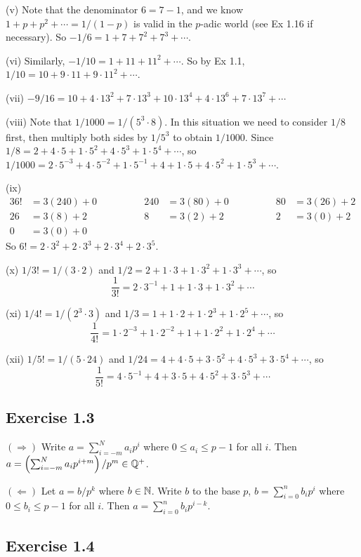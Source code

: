 \documentclass[../Koblitz.tex]{subfiles}
\begin{document}
(v) Note that the denominator $6=7-1$, and we know $1+p+p^2+\cdots=1/(1-p)$ is valid in the $p$-adic world (see Ex 1.16 if necessary). So $-1/6=1+7+7^2+7^3+\cdots$.

(vi) Similarly, $-1/10=1+11+11^2+\cdots$. So by Ex 1.1, $1/10=10+9\cdot11+9\cdot11^2+\cdots$.

(vii) $-9/16=10+4\cdot13^2+7\cdot13^3+10\cdot13^4+4\cdot13^6+7\cdot13^7+\cdots$

(viii) Note that $1/1000=1/(5^3\cdot8)$. In this situation we need to consider $1/8$ first, then multiply both sides by $1/5^3$ to obtain $1/1000$. Since $1/8=2+4\cdot5+1\cdot5^2+4\cdot5^3+1\cdot5^4+\cdots$, so $1/1000=2\cdot5^{-3}+4\cdot5^{-2}+1\cdot5^{-1}+4+1\cdot5+4\cdot5^2+1\cdot5^3+\cdots$.

(ix) \begin{alignat*}{3}
6!&=3(240)+0 &\qquad\qquad 240&=3(80)+0 &\qquad\qquad 80&=3(26)+2 \\
26&=3(8)+2 &\qquad \qquad 8&=3(2)+2 &\qquad\qquad 2&=3(0)+2 \\
0&=3(0)+0
\end{alignat*}
So $6!=2\cdot3^2+2\cdot3^3+2\cdot3^4+2\cdot3^5$.

(x) $1/3!=1/(3\cdot2)$ and $1/2=2+1\cdot3+1\cdot3^2+1\cdot3^3+\cdots$, so $$\frac{1}{3!}=2\cdot3^{-1}+1+1\cdot3+1\cdot3^2+\cdots$$

(xi) $1/4!=1/(2^3\cdot3)$ and $1/3=1+1\cdot2+1\cdot2^3+1\cdot2^5+\cdots$, so $$\frac{1}{4!}=1\cdot2^{-3}+1\cdot2^{-2}+1+1\cdot2^2+1\cdot2^4+\cdots$$

(xii) $1/5!=1/(5\cdot24)$ and $1/24=4+4\cdot5+3\cdot5^2+4\cdot5^3+3\cdot5^4+\cdots$, so $$\frac{1}{5!}=4\cdot5^{-1}+4+3\cdot5+4\cdot5^2+3\cdot5^3+\cdots$$

\subsection*{Exercise 1.3}

$(\Rightarrow)$ Write $a=\sum_{i=-m}^N a_ip^i$ where $0\leq a_i\leq p-1$ for all $i$. Then $a=\left(\sum_{i=-m}^N a_ip^{i+m}\right)/p^m\in\mathbb{Q}^+$.

$(\Leftarrow)$ Let $a=b/p^k$ where $b\in\mathbb{N}$. Write $b$ to the base $p$, $b=\sum_{i=0}^n b_ip^i$ where $0\leq b_i\leq p-1$ for all $i$. Then $a=\sum_{i=0}^n b_ip^{i-k}$.

\subsection*{Exercise 1.4}
\end{document}
